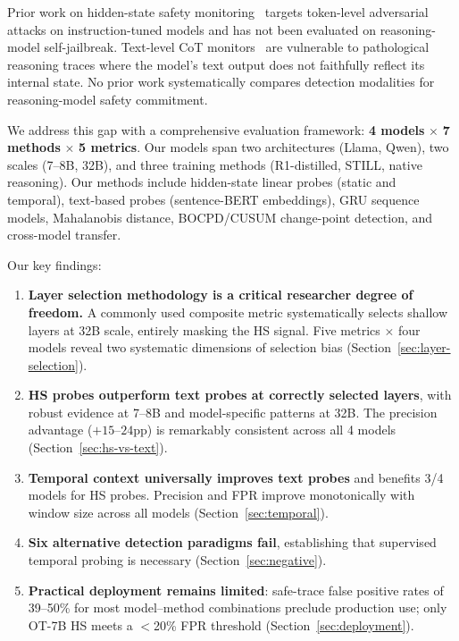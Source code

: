\documentclass[11pt,a4paper]{article}
\newcommand{\pp}{\text{pp}}
\begin{document}
Prior work on hidden-state safety monitoring~\cite{trajguard,safeswitch} targets token-level adversarial attacks on instruction-tuned models and has not been evaluated on reasoning-model self-jailbreak.
Text-level CoT monitors~\cite{saferemind,safethink} are vulnerable to pathological reasoning traces where the model's text output does not faithfully reflect its internal state.
No prior work systematically compares detection modalities for reasoning-model safety commitment.

We address this gap with a comprehensive evaluation framework: \textbf{4 models} $\times$ \textbf{7 methods} $\times$ \textbf{5 metrics}.
Our models span two architectures (Llama, Qwen), two scales (7--8B, 32B), and three training methods (R1-distilled, STILL, native reasoning).
Our methods include hidden-state linear probes (static and temporal), text-based probes (sentence-BERT embeddings), GRU sequence models, Mahalanobis distance, BOCPD/CUSUM change-point detection, and cross-model transfer.

Our key findings:
\begin{enumerate}[nosep,leftmargin=*]
\item \textbf{Layer selection methodology is a critical researcher degree of freedom.} A commonly used composite metric systematically selects shallow layers at 32B scale, entirely masking the HS signal. Five metrics $\times$ four models reveal two systematic dimensions of selection bias (Section~\ref{sec:layer-selection}).
\item \textbf{HS probes outperform text probes at correctly selected layers}, with robust evidence at 7--8B and model-specific patterns at 32B. The precision advantage ($+15$--$24\pp$) is remarkably consistent across all 4 models (Section~\ref{sec:hs-vs-text}).
\item \textbf{Temporal context universally improves text probes} and benefits 3/4 models for HS probes. Precision and FPR improve monotonically with window size across all models (Section~\ref{sec:temporal}).
\item \textbf{Six alternative detection paradigms fail}, establishing that supervised temporal probing is necessary (Section~\ref{sec:negative}).
\item \textbf{Practical deployment remains limited}: safe-trace false positive rates of 39--50\% for most model--method combinations preclude production use; only OT-7B HS meets a $<$20\% FPR threshold (Section~\ref{sec:deployment}).
\end{enumerate}
\end{document}
